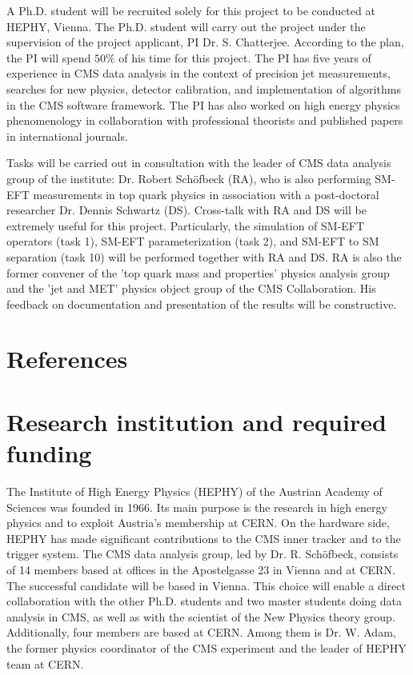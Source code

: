 \documentclass[a4paper,11pt]{article}
\begin{document}
{A Ph.D. student will be recruited solely for this project to be conducted at HEPHY, Vienna. 
The Ph.D. student will carry out the project under the supervision of the project applicant, PI Dr. S. Chatterjee. 
According to the plan, the PI will spend $50\%$ of his time for this project. 
The PI has five years of experience in CMS data analysis in the context of precision jet measurements, searches for new physics, detector calibration, and implementation of algorithms in the CMS software framework. 
The PI has also worked on high energy physics phenomenology in collaboration with professional theorists and published papers in international journals. 

Tasks will be carried out in consultation with the leader of CMS data analysis group of the institute: Dr. Robert Sch{\"o}fbeck (RA), who is also performing SM-EFT measurements in top quark physics in association with a post-doctoral researcher Dr. Dennis Schwartz (DS). Cross-talk with RA and DS will be extremely useful for this project. 
Particularly, the simulation of SM-EFT operators (task 1), SM-EFT parameterization (task 2), and SM-EFT to SM separation (task 10) will be performed together with RA and DS. 
RA is also the former convener of the 'top quark mass and properties' physics analysis group and the 'jet and MET' physics object group of the CMS Collaboration. 
His feedback on documentation and presentation of the results will be constructive. 

\appendix
\renewcommand{\thesection}{Annex \arabic{section}} 

\clearpage
\section{References}
\renewcommand{\refname}{}
{
%


}

\newpage

\section{Research institution and required funding}

The Institute of High Energy Physics (HEPHY) of the Austrian Academy of Sciences was founded in 1966. 
Its main purpose is the research in high energy physics and to exploit Austria's membership at CERN. 
On the hardware side, HEPHY has made significant contributions to the CMS inner tracker and to the trigger system. 
The CMS data analysis group, led by Dr. R. Sch{\"o}fbeck, consists of 14 members based at offices in the Apostelgasse 23 in Vienna and at CERN. The successful candidate will be based in Vienna. 
This choice will enable a direct collaboration with the other Ph.D. students and two master students doing data analysis in CMS, as well as with the scientist of the New Physics theory group.
Additionally, four members are based at CERN. 
Among them is Dr. W. Adam, the former physics coordinator of the CMS experiment and the leader of HEPHY team at CERN.

}
\end{document}
